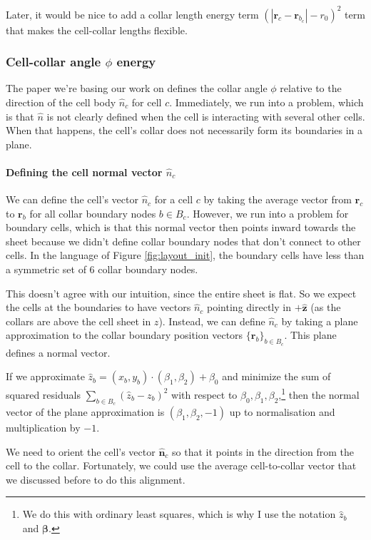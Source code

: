 \documentclass[draft]{article}
\begin{document}
Later, it would be nice to add a collar length energy term $(|\bm{r}_c - \bm{r}_{b_{c}}| - r_0)^2$ term that makes the cell-collar lengths flexible.

\subsubsection{Cell-collar angle $\phi$ energy}

The paper we're basing our work on defines the collar angle $\phi$ relative to the direction of the cell body $\hat{n}_c$ for cell $c$. Immediately, we run into a problem, which is that $\hat{n}$ is not clearly defined when the cell is interacting with several other cells. When that happens, the cell's collar does not necessarily form its boundaries in a plane. 

\paragraph{Defining the cell normal vector $\hat{n}_c$}
We can define the cell's vector $\hat{n}_c$ for a cell $c$ by taking the average vector from $\bm{r}_c$ to $\bm{r}_b$ for all collar boundary nodes $b \in B_c$. However, we run into a problem for boundary cells, which is that this normal vector then points inward towards the sheet because we didn't define collar boundary nodes that don't connect to other cells. In the language of Figure \ref{fig:layout_init}, the boundary cells have less than a symmetric set of 6 collar boundary nodes. 

This doesn't agree with our intuition, since the entire sheet is flat. So we expect the cells at the boundaries to have vectors $\hat{n}_c$ pointing directly in $+\hat{\bm{z}}$ (as the collars are above the cell sheet in $z$). Instead, we can define $\hat{n}_c$ by taking a plane approximation to the collar boundary position vectors $\{ \bm{r}_b \}_{b \in B_c}$. This plane defines a normal vector.

If we approximate $\hat{z}_b = (x_b, y_b)\cdot (\beta_1, \beta_2) + \beta_0$ and minimize the sum of squared residuals $\sum_{b\in B_c} (\hat{z}_b - z_b)^2$ with respect to $\beta_0, \beta_1, \beta_2$,\footnote{We do this with ordinary least squares, which is why I use the notation $\hat{z}_b$ and $\bm{\beta}$.} then the normal vector of the plane approximation is $(\beta_1, \beta_2, -1)$ up to normalisation and multiplication by $-1$. 

We need to orient the cell's vector $\hat{\bm{n}}_c$ so that it points in the direction from the cell to the collar. Fortunately, we could use the average cell-to-collar vector that we discussed before to do this alignment. 
\end{document}
